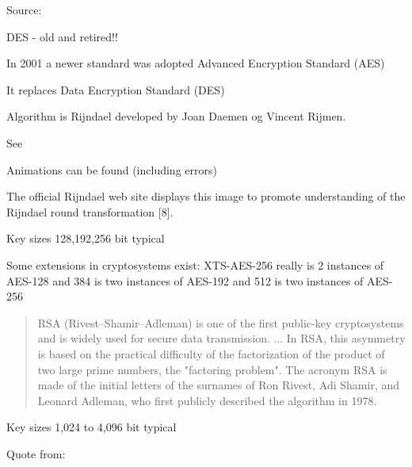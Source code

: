 \documentclass[Screen16to9,17pt]{foils}
\begin{document}
Source: 




\begin{list1}
\item DES - old and retired!!
\item In 2001 a newer standard was adopted Advanced Encryption Standard (AES)
\item It replaces Data Encryption Standard (DES)
\item Algorithm is Rijndael developed by Joan Daemen og Vincent Rijmen.
\item See 
\item Animations can be found (including errors)\\
\end{list1}



\begin{list2}
\item The official Rijndael web site displays this image to promote understanding of the Rijndael round transformation [8].
\item Key sizes 128,192,256 bit typical
\item Some extensions in cryptosystems exist: XTS-AES-256 really is 2 instances of AES-128 and 384 is two instances of AES-192 and 512 is two instances of AES-256
\item {}
\end{list2}



\begin{quote}
RSA (Rivest–Shamir–Adleman) is one of the first public-key cryptosystems and is widely used for secure data transmission. ...
In RSA, this asymmetry is based on the practical difficulty of the factorization of the product of two large prime numbers, the "factoring problem". The acronym RSA is made of the initial letters of the surnames of Ron Rivest, Adi Shamir, and Leonard Adleman, who first publicly described the algorithm in 1978.
\end{quote}

\begin{list2}
\item Key sizes 1,024 to 4,096 bit typical
\item  Quote from: 
\end{list2}
\end{document}
